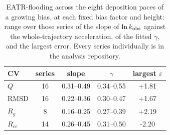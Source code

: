 \begin{table}[H]\centering
\caption{EATR-flooding across the eight deposition paces of a growing bias, at each fixed bias factor and height: range over those series of the slope of $\ln k_{\rm obs}$ against the whole-trajectory acceleration, of the fitted $\gamma$, and the largest error. Every series individually is in the analysis repository.}\label{tab:s8}
\begin{tabular}{lcccc}\toprule
CV & series & slope & $\gamma$ & largest $\varepsilon$\\ \midrule
$Q$ & 16 & 0.31--0.49 & 0.34--0.55 & +1.81 \\
RMSD & 16 & 0.22--0.36 & 0.30--0.47 & +1.67 \\
$R_g$ & 8 & 0.16--0.25 & 0.27--0.39 & +2.19 \\
$R_{ee}$ & 14 & 0.26--0.45 & 0.31--0.50 & -2.20\\ \bottomrule
\end{tabular}
\end{table}
